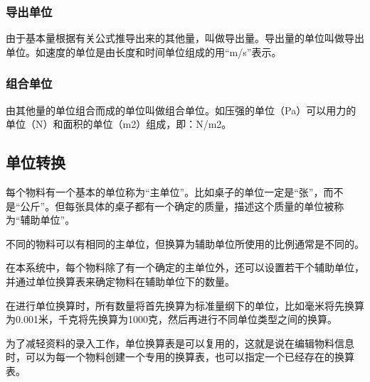     \subsubsection {导出单位}

        由于基本量根据有关公式推导出来的其他量，叫做导出量。导出量的单位叫做导出单位。如速度的单位是由长度和时间单位组成的用“m/s”表示。

    \subsubsection {组合单位}

        由其他量的单位组合而成的单位叫做组合单位。如压强的单位（Pa）可以用力的单位（N）和面积的单位（m2）组成，即：N/m2。



\subsection {单位转换}

    每个物料有一个基本的单位称为“主单位”。比如桌子的单位一定是“张”，而不是“公斤”。但每张具体的桌子都有一个确定的质量，描述这个质量的单位被称为“辅助单位”。

    不同的物料可以有相同的主单位，但换算为辅助单位所使用的比例通常是不同的。

    在本系统中，每个物料除了有一个确定的主单位外，还可以设置若干个辅助单位，并通过单位换算表来确定物料在辅助单位下的数量。

    在进行单位换算时，所有数量将首先换算为标准量纲下的单位，比如毫米将先换算为0.001米，千克将先换算为1000克，然后再进行不同单位类型之间的换算。

    为了减轻资料的录入工作，单位换算表是可以复用的，这就是说在编辑物料信息时，可以为每一个物料创建一个专用的换算表，也可以指定一个已经存在的换算表。
